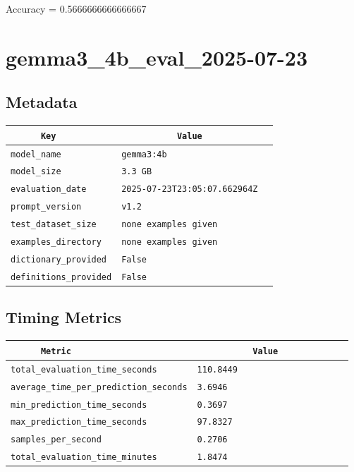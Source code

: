 \documentclass{article}
\begin{document}
\begin{center}
Accuracy = 0.5666666666666667
\end{center}

\section{gemma3\_4b\_eval\_2025-07-23}
\subsection{Metadata}

\begin{center}
\begin{tabular}{l | l} \hline
    \verb|      Key      | & \verb|           Value           | \\ \hline
    \hline
    \verb|model_name    | & \verb|gemma3:4b                    | \\ \hline
    \verb|model_size    | & \verb|3.3 GB                       | \\ \hline
    \verb|evaluation_date| & \verb|2025-07-23T23:05:07.662964Z  | \\ \hline
    \verb|prompt_version| & \verb|v1.2                         | \\ \hline
    \verb|test_dataset_size| & \verb|none examples given          | \\ \hline
    \verb|examples_directory| & \verb|none examples given          | \\ \hline
    \verb|dictionary_provided| & \verb|False                        | \\ \hline
    \verb|definitions_provided| & \verb|False                        | \\ \hline
\end{tabular}
\end{center}

\subsection{Timing Metrics}

\begin{center}
\begin{tabular}{l | l} \hline
    \verb|      Metric     | & \verb|           Value           | \\ \hline
    \hline
    \verb|total_evaluation_time_seconds| & \verb|110.8449                     | \\ \hline
    \verb|average_time_per_prediction_seconds| & \verb|3.6946                       | \\ \hline
    \verb|min_prediction_time_seconds| & \verb|0.3697                       | \\ \hline
    \verb|max_prediction_time_seconds| & \verb|97.8327                      | \\ \hline
    \verb|samples_per_second| & \verb|0.2706                       | \\ \hline
    \verb|total_evaluation_time_minutes| & \verb|1.8474                       | \\ \hline
\end{tabular}
\end{center}
\end{document}
